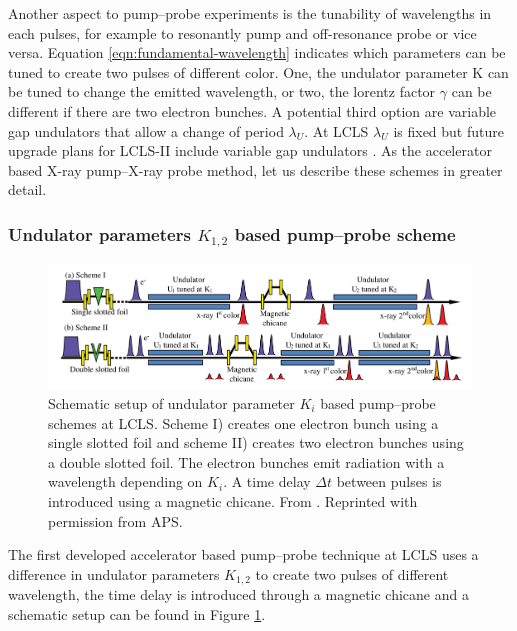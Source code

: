 Another aspect to pump--probe experiments is the tunability of wavelengths in each pulses, for example to resonantly pump and off-resonance probe or vice versa. Equation \eqref{eqn:fundamental-wavelength} indicates which parameters can be tuned to create two pulses of different color. One, the undulator parameter K can be tuned to change the emitted wavelength, or two, the lorentz factor $\gamma$ can be different if there are two electron bunches. A potential third option are variable gap undulators that allow a change of period $\lambda_{U}$. At LCLS $\lambda_{U}$ is fixed but future upgrade plans for LCLS-II include variable gap undulators \citep{Galayda-2014-IPAC}. As the accelerator based X-ray pump--X-ray probe method, let us describe these schemes in greater detail.
%
%
%
\subsubsection{Undulator parameters $K_{1,2}$ based pump--probe scheme}
\begin{figure}
	\centering
		\includegraphics[width=1.00\textwidth]{images/Albertos-pump-probe-scheme.png}
	\caption[Schematic setup of an undulator based pump--probe scheme.]{Schematic setup of undulator parameter $K_{i}$ based pump--probe schemes at LCLS. Scheme I) creates one electron bunch using a single slotted foil and scheme II) creates two electron bunches using a double slotted foil. The electron bunches emit radiation with a wavelength depending on $K_{i}$. A time delay $\Delta t$ between pulses is introduced using a magnetic chicane. From \cite{Lutman-2013-PRL}. Reprinted with permission from APS.}
	\label{fig:Albertos-pump-probe-scheme}
\end{figure}
The first developed accelerator based pump--probe technique at LCLS \cite{Lutman-2013-PRL} uses a difference in undulator parameters $K_{1,2}$ to create two pulses of different wavelength, the time delay is introduced through a magnetic chicane and a schematic setup can be found in Figure \ref{fig:Albertos-pump-probe-scheme}.\\
